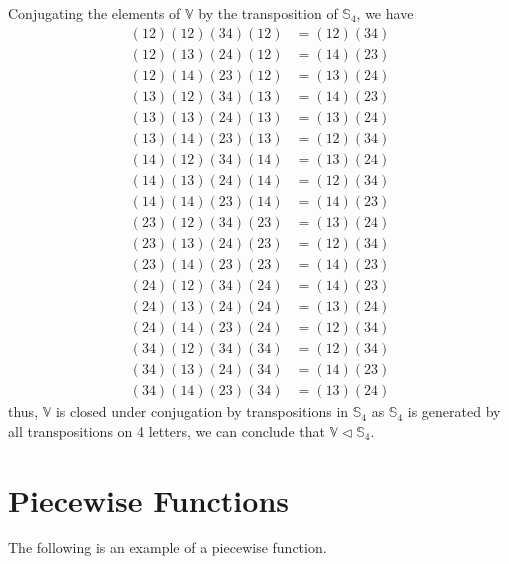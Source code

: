Conjugating the elements of $\mathbb{V}$ by the transposition of
$\mathbb{S}_4$, we have
\begin{align*}
  (12)(12)(34)(12) &= (12)(34) \\
  (12)(13)(24)(12) &= (14)(23) \\
  (12)(14)(23)(12) &= (13)(24) \\
  (13)(12)(34)(13) &= (14)(23) \\
  (13)(13)(24)(13) &= (13)(24) \\
  (13)(14)(23)(13) &= (12)(34) \\
  (14)(12)(34)(14) &= (13)(24) \\
  (14)(13)(24)(14) &= (12)(34) \\
  (14)(14)(23)(14) &= (14)(23) \\
  (23)(12)(34)(23) &= (13)(24) \\
  (23)(13)(24)(23) &= (12)(34) \\
  (23)(14)(23)(23) &= (14)(23) \\
  (24)(12)(34)(24) &= (14)(23) \\
  (24)(13)(24)(24) &= (13)(24) \\
  (24)(14)(23)(24) &= (12)(34) \\
  (34)(12)(34)(34) &= (12)(34) \\
  (34)(13)(24)(34) &= (14)(23) \\
  (34)(14)(23)(34) &= (13)(24)
\end{align*}
thus, $\mathbb{V}$ is closed under conjugation by transpositions in
$\mathbb{S}_4$ as $\mathbb{S}_4$ is generated by all transpositions on
4 letters, we can conclude that $\mathbb{V} \lhd \mathbb{S}_4$.

\section{Piecewise Functions}
\label{sec:piecewise-functions-1}

The following is an example of a piecewise function.

